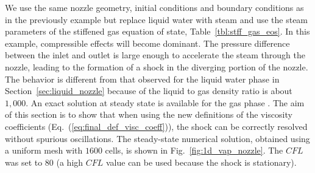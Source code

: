 \documentclass[preprint,10pt]{elsarticle}
\newcommand{\eqt}[1]{Eq.~(\ref{#1})}                     %
\newcommand{\fig}[1]{Fig.~\ref{#1}}                      %
\newcommand{\tbl}[1]{Table~\ref{#1}}                     %
\newcommand{\sct}[1]{Section~\ref{#1}}                   %
\begin{document}
We use the same nozzle geometry, initial conditions and boundary conditions as in the previously example but replace liquid water with steam and use the steam parameters of the stiffened gas equation of state, \tbl{tbl:stff_gas_eos}. In this example, compressible effects will become dominant. 
The pressure difference between the inlet and outlet is large enough to accelerate the steam through the nozzle, leading to the formation of a shock in the diverging portion of the nozzle. The behavior is different from that observed for the liquid water phase in \sct{sec:liquid_nozzle} because of the liquid to gas density ratio is about $1,000$. An exact solution at steady state is available for the gas phase \cite{nozzle_exact}. The aim of this section is to show that when using the new definitions of the viscosity coefficients (\eqt{eq:final_def_visc_coeff}), the shock can be correctly resolved without spurious oscillations. The steady-state numerical solution, obtained using a uniform mesh with $1600$ cells, is shown in \fig{fig:1d_vap_nozzle}. The $CFL$ was set to $80$ (a high $CFL$ value can be used because the shock is stationary).
\end{document}
